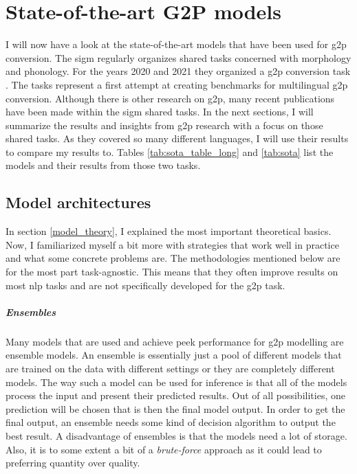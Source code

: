 \section{State-of-the-art G2P models}
\label{section:sig}
I will now have a look at the state-of-the-art models that have been used for \ac{g2p} conversion. The \ac{sigm} \citep{Sigmorphon.2021} regularly organizes shared tasks concerned with morphology and phonology. For the years 2020 and 2021 they organized a \ac{g2p} conversion task \citep{Ashby-Bartley.2021, gorman-etal-2020-sigmorphon}. The tasks represent a first attempt at creating benchmarks for multilingual \ac{g2p} conversion. Although there is other research on \ac{g2p}, many recent publications have been made within the \ac{sigm} shared tasks. In the next sections, I will summarize the results and insights from \ac{g2p} research with a focus on those shared tasks. As they covered so many different languages, I will use their results to compare my results to. Tables \ref{tab:sota_table_long} and \ref{tab:sota} list the models and their results from those two tasks.

\subsection{Model architectures}
In section \ref{model_theory}, I explained the most important theoretical basics. Now, I familiarized myself a bit more with strategies that work well in practice and what some concrete problems are. The methodologies mentioned below are for the most part task-agnostic. This means that they often improve results on most \ac{nlp} tasks and are not specifically developed for the \ac{g2p} task.

\subparagraph{Ensembles}
Many models that are used and achieve peek performance for \ac{g2p} modelling are ensemble models. An ensemble is essentially just a pool of different models that are trained on the data with different settings or they are completely different models. The way such a model can be used for inference is that all of the models process the input and present their predicted results. Out of all possibilities, one prediction will be chosen that is then the final model output. In order to get the final output, an ensemble needs some kind of decision algorithm to output the best result. A disadvantage of ensembles is that the models need a lot of storage. Also, it is to some extent a bit of a \textit{brute-force} approach as it could lead to preferring quantity over quality. 

